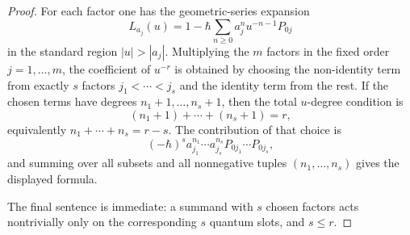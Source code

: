 \begin{proof}
For each factor one has the geometric-series expansion
\[
L_{a_j}(u)
=
1-\hbar\sum_{n\ge0}a_j^n u^{-n-1}P_{0j}
\]
in the standard region $|u|>|a_j|$. Multiplying the $m$ factors in the
fixed order $j=1,\dots,m$, the coefficient of $u^{-r}$ is obtained by
choosing the non-identity term from exactly $s$ factors
$j_1<\cdots<j_s$ and the identity term from the rest. If the chosen
terms have degrees $n_1+1,\dots,n_s+1$, then the total $u$-degree
condition is
\[
(n_1+1)+\cdots+(n_s+1)=r,
\]
equivalently $n_1+\cdots+n_s=r-s$. The contribution of that choice is
\[
(-\hbar)^s a_{j_1}^{n_1}\cdots a_{j_s}^{n_s}
P_{0j_1}\cdots P_{0j_s},
\]
and summing over all subsets and all nonnegative tuples
$(n_1,\dots,n_s)$ gives the displayed formula.

The final sentence is immediate: a summand with $s$ chosen factors
acts nontrivially only on the corresponding $s$ quantum slots, and
$s\le r$.
\end{proof}

